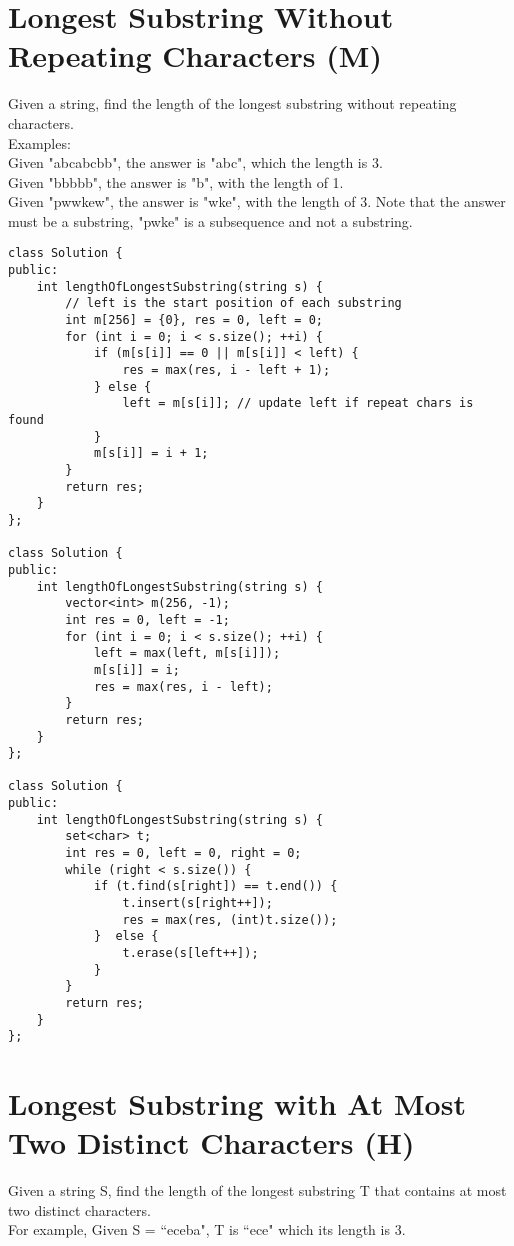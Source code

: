 \section{Longest Substring Without Repeating Characters (M)}
Given a string, find the length of the longest substring without repeating characters.\\

Examples:\\
Given "abcabcbb", the answer is "abc", which the length is 3.\\
Given "bbbbb", the answer is "b", with the length of 1.\\
Given "pwwkew", the answer is "wke", with the length of 3. Note that the answer must be a substring, "pwke" is a subsequence and not a substring.\\

\begin{lstlisting}
class Solution {
public:
    int lengthOfLongestSubstring(string s) {
        // left is the start position of each substring
        int m[256] = {0}, res = 0, left = 0;
        for (int i = 0; i < s.size(); ++i) {
            if (m[s[i]] == 0 || m[s[i]] < left) {
                res = max(res, i - left + 1);
            } else {
                left = m[s[i]]; // update left if repeat chars is found
            }
            m[s[i]] = i + 1;
        }
        return res;
    }
};

class Solution {
public:
    int lengthOfLongestSubstring(string s) {
        vector<int> m(256, -1);
        int res = 0, left = -1;
        for (int i = 0; i < s.size(); ++i) {
            left = max(left, m[s[i]]);
            m[s[i]] = i;
            res = max(res, i - left);
        }
        return res;
    }
};

class Solution {
public:
    int lengthOfLongestSubstring(string s) {
        set<char> t;
        int res = 0, left = 0, right = 0;
        while (right < s.size()) {
            if (t.find(s[right]) == t.end()) {
                t.insert(s[right++]);
                res = max(res, (int)t.size());
            }  else {
                t.erase(s[left++]);
            }
        }
        return res;
    }
};
\end{lstlisting}

\section{Longest Substring with At Most Two Distinct Characters (H)}
Given a string S, find the length of the longest substring T that contains at most two distinct characters.\\
For example,
Given S = ``eceba",
T is ``ece" which its length is 3. \\

